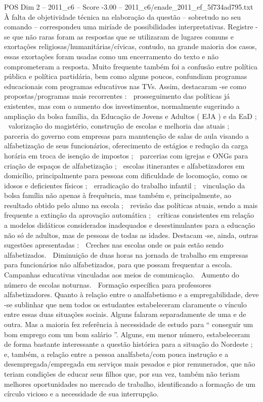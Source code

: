 \begin{textsample}{POS Dim 2 – 2011\_c6 – Score -3.00 – 2011\_c6/enade\_2011\_ef\_5f734ad795.txt}
À falta de objetividade técnica na elaboração da questão – sobretudo no seu comando – correspondeu uma miríade de possibilidades interpretativas.
Registre -se que não raras foram as respostas que se utilizaram de lugares comuns e exortações religiosas/humanitárias/cívicas, contudo, na grande maioria dos casos, essas exortações foram usadas como um encerramento do texto e não comprometeram a resposta.
Muito frequente também foi a confusão entre política pública e política partidária, bem como alguns poucos, confundiam programas educacionais com programas educativos nas TVs.
Assim, destacaram -se como propostas/programas mais recorrentes :  prosseguimento das políticas já existentes, mas com o aumento dos investimentos, normalmente sugerindo a ampliação da bolsa família, da Educação de Jovens e Adultos ( EJA ) e da EaD ;  valorização do magistério, construção de escolas e melhoria das atuais ;  parceria do governo com empresas para manutenção de salas de aula visando a alfabetização de seus funcionários, oferecimento de estágios e redução da carga horária em troca de isenção de impostos ;  parcerias com igrejas e ONGs para criação de espaços de alfabetização ;  escolas itinerantes e alfabetizadores em domicílio, principalmente para pessoas com dificuldade de locomoção, como os idosos e deficientes físicos ;  erradicação do trabalho infantil ;  vinculação da bolsa família não apenas à frequência, mas também e, principalmente, ao resultado obtido pelo aluno na escola ;  revisão das políticas atuais, sendo a mais frequente a extinção da aprovação automática ;  críticas consistentes em relação a modelos didáticos considerados inadequados e desestimulantes para a educação não só de adultos, mas de pessoas de todas as idades.
Destacam -se, ainda, outras sugestões apresentadas :  Creches nas escolas onde os pais estão sendo alfabetizados.  Diminuição de duas horas na jornada de trabalho em empresas para funcionários não alfabetizados, para que possam frequentar a escola.  Campanhas educativas vinculadas aos meios de comunicação.  Aumento do número de escolas noturnas.  Formação específica para professores alfabetizadores.
Quanto à relação entre o analfabetismo e a empregabilidade, deve -se sublinhar que nem todos os estudantes estabeleceram claramente o vínculo entre essas duas situações sociais.
Alguns falaram separadamente de uma e de outra.
Mas a maioria fez referência à necessidade de estudo para “ conseguir um bom emprego com um bom salário ”.
Alguns, em menor número, estabeleceram de forma bastante interessante a questão histórica para a situação do Nordeste ; e, também, a relação entre a pessoa analfabeta/com pouca instrução e a desempregada/empregada em serviços mais pesados e pior remunerados, que não teriam condições de educar seus filhos que, por sua vez, também não teriam melhores oportunidades no mercado de trabalho, identificando a formação de um círculo vicioso e a necessidade de sua interrupção.

\end{textsample}
